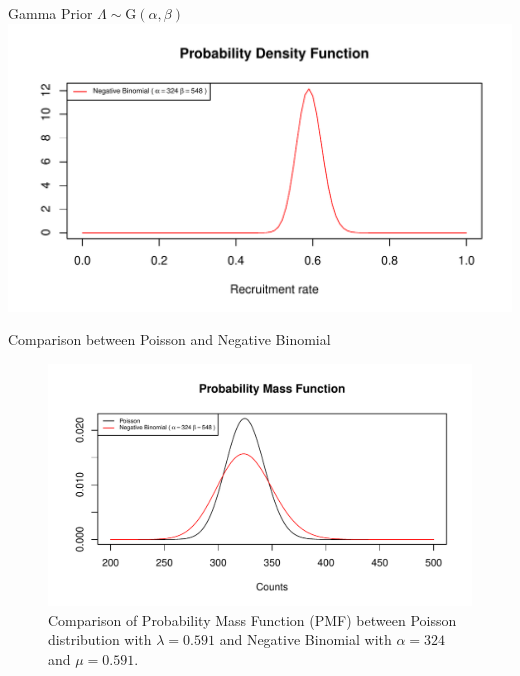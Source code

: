 \documentclass[english]{beamer}\usepackage[]{graphicx}\usepackage[]{xcolor}
\makeatletter
\def\maxwidth{ %
  \ifdim\Gin@nat@width>\linewidth
    \linewidth
  \else
    \Gin@nat@width
  \fi
}
\newenvironment{knitrout}{}{} %
\makeatother
\begin{document}
\begin{frame}{Gamma Prior}
$\Lambda \sim \textrm{G}(\alpha,\beta)$
\begin{knitrout}
\color{fgcolor}
\includegraphics[width=\maxwidth]{figures/figunnamed-chunk-8-1} 
\end{knitrout}

\end{frame}


\begin{frame}{Comparison between Poisson and Negative Binomial}
\begin{figure}
\begin{knitrout}
\color{fgcolor}
\includegraphics[width=\maxwidth]{figures/figunnamed-chunk-9-1} 
\end{knitrout}
  \caption{Comparison of Probability Mass Function (PMF) between Poisson distribution with $\lambda = 0.591$ and Negative Binomial with $\alpha = 324$ and $\mu = 0.591$.}
  \label{fig:2_6}
\end{figure}
\end{frame}
\end{document}
